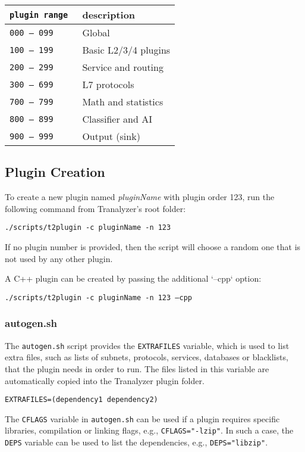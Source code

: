 \documentclass[documentation]{subfiles}
\begin{document}
\begin{longtable}{>{\tt}ll}
    \toprule
    {\bf plugin range} & {\bf description}\\
    \midrule\endhead%
    000 -- 099 & Global\\
    100 -- 199 & Basic L2/3/4 plugins\\
    200 -- 299 & Service and routing\\
    300 -- 699 & L7 protocols\\
    700 -- 799 & Math and statistics\\
    800 -- 899 & Classifier and AI\\
    900 -- 999 & Output (sink)\\
    \bottomrule
\end{longtable}

\subsection{Plugin Creation}
To create a new plugin named {\em pluginName} with plugin order 123, run the following command from Tranalyzer's root folder:
\begin{center}
    {\tt ./scripts/t2plugin -c pluginName -n 123}
\end{center}

If no plugin number is provided, then the script will choose a random one that is not used by any other plugin.

A C++ plugin can be created by passing the additional `--cpp` option:
\begin{center}
    {\tt ./scripts/t2plugin -c pluginName -n 123 --cpp}
\end{center}

\subsubsection{autogen.sh}
The {\tt autogen.sh} script provides the {\tt EXTRAFILES} variable, which is used to list extra files, such as lists of subnets, protocols, services, databases or blacklists, that the plugin needs in order to run.
The files listed in this variable are automatically copied into the Tranalyzer plugin folder.
\begin{center}
{\tt EXTRAFILES=(dependency1 dependency2)}
\end{center}

The {\tt CFLAGS} variable in {\tt autogen.sh} can be used if a plugin requires specific libraries, compilation or linking flags, e.g., {\tt CFLAGS="-lzip"}.
In such a case, the {\tt DEPS} variable can be used to list the dependencies, e.g., {\tt DEPS="libzip"}.
\end{document}
